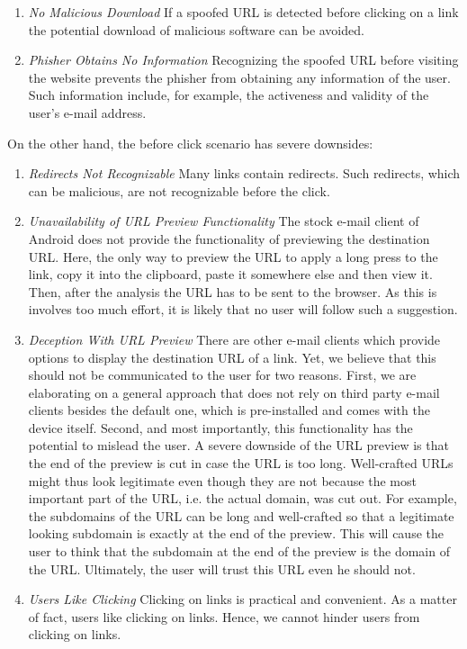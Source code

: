 \begin{description}[leftmargin=0cm]
\begin{enumerate}
	\item \textit{No Malicious Download} If a spoofed URL is detected before clicking on a link the potential download of  malicious software can be avoided. 
	\item \textit{Phisher Obtains No Information} Recognizing the spoofed URL before visiting the website prevents the phisher from obtaining any information of the user. Such information include, for example, the activeness and validity of the user's e-mail address. 
\end{enumerate}

On the other hand, the before click scenario has severe downsides:

\begin{enumerate}
	\item \textit{Redirects Not Recognizable} Many links contain redirects. Such redirects, which can be malicious, are not recognizable before the click.
	\item \textit{Unavailability of URL Preview Functionality} The stock e-mail client of Android does not provide the functionality of previewing the destination URL. 
Here, the only way to preview the URL to apply a long press to the link, copy it into the clipboard, paste it somewhere else and then view it. 
Then, after the analysis the URL has to be sent to the browser.
As this is involves too much effort, it is likely that no user will follow such a suggestion.
	\item \textit{Deception With URL Preview} There are other e-mail clients which provide options to display the destination URL of a link.
Yet, we believe that this should not be communicated to the user for two reasons.
First, we are elaborating on a general approach that does not rely on third party e-mail clients besides the default one, which is pre-installed and comes with the device itself.
Second, and most importantly, this functionality has the potential to mislead the user.
A severe downside of the URL preview is that the end of the preview is cut in case the URL is too long.
 Well-crafted URLs might thus look legitimate even though they are not because the most important part of the URL, i.e. the actual domain, was cut out.
 For example, the subdomains of the URL can be long and well-crafted so that a legitimate looking subdomain is exactly at the end of the preview.
 This will cause the user to think that the subdomain at the end of the preview is the domain of the URL.
 Ultimately, the user will trust this URL even he should not.
	\item \textit{Users Like Clicking} Clicking on links is practical and convenient. As a matter of fact, users like clicking on links. Hence, we cannot hinder users from clicking on links.
\end{enumerate}


\end{description}
